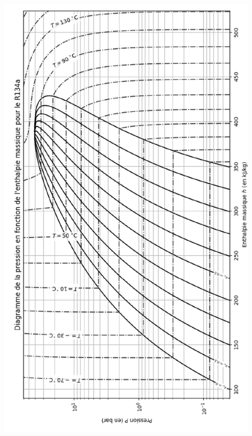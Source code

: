 \documentclass[a4paper, 12pt, garamond]{book}
\begin{document}
\includegraphics[height=.95\textheight]{figures/pb-chambre-ph.pdf}
\end{document}
